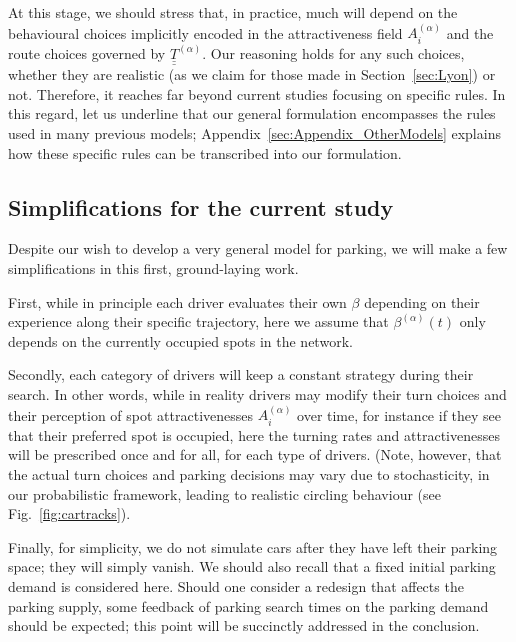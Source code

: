 \documentclass[trsc,reprint]{informs3}
\newcommand{\uul}[1]{\underline{\underline{#1}}}
\newcommand{\alp}{^{(\alpha)}}
\newcommand{\AN}[1]{#1}
\begin{document}
At this stage, we should stress that, in practice, much will depend on the behavioural choices implicitly
encoded in the attractiveness field $A_i\alp$ and the route choices governed by ${\uul{T}}\alp$. Our reasoning holds for any such choices, whether they are realistic (as we
claim for those made in Section~\ref{sec:Lyon}) or not. Therefore, it reaches far beyond current studies focusing on specific rules. In this regard, let us underline that our general formulation encompasses 
the rules used in \AN{many} previous models; \AN{ Appendix~\ref{sec:Appendix_OtherModels} explains how
these specific rules can be transcribed into our formulation.}




\subsection{Simplifications for the current study}

Despite our wish to develop a very general model for parking,
we will make \AN{a few simplifications} in this first, ground-laying work.

First, while in principle each driver evaluates their own $\beta$
depending on their experience along their specific trajectory, here we
assume that $\beta\alp(t)$ only depends on the currently occupied spots in the network.

Secondly, each category of drivers will keep a constant strategy during their search.
In other words, while in reality drivers may modify their turn choices and their perception of spot attractivenesses $A_i\alp$ over time, for instance if they see that their preferred spot is occupied, here the turning rates and attractivenesses will be prescribed once and for all, for each type of drivers. (Note, however, that the actual turn choices and parking decisions may vary due to stochasticity, in  our probabilistic framework, leading to realistic circling behaviour (see Fig.~\ref{fig:cartracks}).

Finally, for simplicity, we do not \AN{simulate} cars after they have left
their parking space; they will simply vanish.
We should also recall that a fixed initial parking demand is considered here. \AN{Should one consider a redesign that affects the parking supply, some feedback of parking search times
on the parking demand should be expected; this point will be succinctly addressed in the conclusion.}
\end{document}

